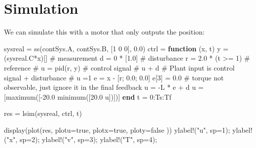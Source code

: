 \documentclass[
  8pt,
  a4paper,
]{book}
\newenvironment{Shaded}{\begin{snugshade}}{\end{snugshade}}
\newcommand{\CommentTok}[1]{\textcolor[rgb]{0.37,0.37,0.37}{#1}}
\newcommand{\ConstantTok}[1]{\textcolor[rgb]{0.56,0.35,0.01}{#1}}
\newcommand{\FloatTok}[1]{\textcolor[rgb]{0.68,0.00,0.00}{#1}}
\newcommand{\FunctionTok}[1]{\textcolor[rgb]{0.28,0.35,0.67}{#1}}
\newcommand{\KeywordTok}[1]{\textcolor[rgb]{0.00,0.23,0.31}{\textbf{#1}}}
\newcommand{\NormalTok}[1]{\textcolor[rgb]{0.00,0.23,0.31}{#1}}
\newcommand{\OperatorTok}[1]{\textcolor[rgb]{0.37,0.37,0.37}{#1}}
\newcommand{\StringTok}[1]{\textcolor[rgb]{0.13,0.47,0.30}{#1}}
\begin{document}
\section{Simulation}\label{simulation-1}

We can simulate this with a motor that only outputs the position:

\begin{Shaded}
\begin{Highlighting}[]
\NormalTok{sysreal }\OperatorTok{=} \FunctionTok{ss}\NormalTok{(contSys.A, contSys.B, [}\FloatTok{1} \FloatTok{0} \FloatTok{0}\NormalTok{], }\FloatTok{0.0}\NormalTok{)}
\NormalTok{ctrl }\OperatorTok{=} \KeywordTok{function}\NormalTok{ (x, t)}
\NormalTok{    y }\OperatorTok{=}\NormalTok{ (sysreal.C}\OperatorTok{*}\NormalTok{x)[] }\CommentTok{\# measurement}
\NormalTok{    d }\OperatorTok{=} \FloatTok{0} \OperatorTok{*}\NormalTok{ [}\FloatTok{1.0}\NormalTok{]        }\CommentTok{\# disturbance}
\NormalTok{    r }\OperatorTok{=} \FloatTok{2.0} \OperatorTok{*}\NormalTok{ (t }\OperatorTok{\textgreater{}=} \FloatTok{1}\NormalTok{) }\CommentTok{\# reference}
    \CommentTok{\# u = pid(r, y) \# control signal}
    \CommentTok{\# u + d \# Plant input is control signal + disturbance}
    \CommentTok{\# u =1}
    \ConstantTok{e} \OperatorTok{=}\NormalTok{ x }\OperatorTok{{-}}\NormalTok{ [r; }\FloatTok{0.0}\NormalTok{; }\FloatTok{0.0}\NormalTok{]}
    \ConstantTok{e}\NormalTok{[}\FloatTok{3}\NormalTok{] }\OperatorTok{=} \FloatTok{0.0} \CommentTok{\# torque not observable, just ignore it in the final feedback}
\NormalTok{    u }\OperatorTok{=} \OperatorTok{{-}}\NormalTok{L }\OperatorTok{*} \ConstantTok{e} \OperatorTok{+}\NormalTok{ d}
\NormalTok{    u }\OperatorTok{=}\NormalTok{ [}\FunctionTok{maximum}\NormalTok{([}\OperatorTok{{-}}\FloatTok{20.0} \FunctionTok{minimum}\NormalTok{([}\FloatTok{20.0}\NormalTok{ u])])]}
\KeywordTok{end}
\NormalTok{t }\OperatorTok{=} \FloatTok{0}\OperatorTok{:}\NormalTok{Ts}\OperatorTok{:}\NormalTok{Tf}

\NormalTok{res }\OperatorTok{=} \FunctionTok{lsim}\NormalTok{(sysreal, ctrl, t)}

\FunctionTok{display}\NormalTok{(}\FunctionTok{plot}\NormalTok{(res, }
\NormalTok{    plotu}\OperatorTok{=}\ConstantTok{true}\NormalTok{, }
\NormalTok{    plotx}\OperatorTok{=}\ConstantTok{true}\NormalTok{, }
\NormalTok{    ploty}\OperatorTok{=}\ConstantTok{false}
\NormalTok{    ))}
\FunctionTok{ylabel!}\NormalTok{(}\StringTok{"u"}\NormalTok{, sp}\OperatorTok{=}\FloatTok{1}\NormalTok{);}
\FunctionTok{ylabel!}\NormalTok{(}\StringTok{"x"}\NormalTok{, sp}\OperatorTok{=}\FloatTok{2}\NormalTok{);}
\FunctionTok{ylabel!}\NormalTok{(}\StringTok{"v"}\NormalTok{, sp}\OperatorTok{=}\FloatTok{3}\NormalTok{);}
\FunctionTok{ylabel!}\NormalTok{(}\StringTok{"T"}\NormalTok{, sp}\OperatorTok{=}\FloatTok{4}\NormalTok{);}
\end{Highlighting}
\end{Shaded}
\end{document}
